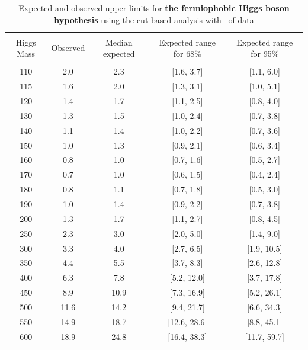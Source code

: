 \begin{table}[!hbp]
\begin{center}
\begin{tabular}{c c c c c}
\hline
\vspace{-3mm} && \\
 Higgs Mass   & Observed & Median expected & Expected range for 68\% & Expected range for 95\%   \\
\vspace{-3mm} && \\
\hline
110 & 2.0 & 2.3 & [1.6, 3.7] & [1.1, 6.0] \\
115 & 1.6 & 2.0 & [1.3, 3.1] & [1.0, 5.1] \\
120 & 1.4 & 1.7 & [1.1, 2.5] & [0.8, 4.0] \\
130 & 1.3 & 1.5 & [1.0, 2.4] & [0.7, 3.8] \\
140 & 1.1 & 1.4 & [1.0, 2.2] & [0.7, 3.6] \\
150 & 1.0 & 1.3 & [0.9, 2.1] & [0.6, 3.4] \\
160 & 0.8 & 1.0 & [0.7, 1.6] & [0.5, 2.7] \\
170 & 0.7 & 1.0 & [0.6, 1.5] & [0.4, 2.4] \\
180 & 0.8 & 1.1 & [0.7, 1.8] & [0.5, 3.0] \\
190 & 1.0 & 1.4 & [0.9, 2.2] & [0.7, 3.8] \\
200 & 1.3 & 1.7 & [1.1, 2.7] & [0.8, 4.5] \\
250 & 2.3 & 3.0 & [2.0, 5.0] & [1.4, 9.0] \\
300 & 3.3 & 4.0 & [2.7, 6.5] & [1.9, 10.5] \\
350 & 4.4 & 5.5 & [3.7, 8.3] & [2.6, 12.8] \\
400 & 6.3 & 7.8 & [5.2, 12.0] & [3.7, 17.8] \\
450 & 8.9 & 10.9 & [7.3, 16.9] & [5.2, 26.1] \\
500 & 11.6 & 14.2 & [9.4, 21.7] & [6.6, 34.3] \\
550 & 14.9 & 18.7 & [12.6, 28.6] & [8.8, 45.1] \\
600 & 18.9 & 24.8 & [16.4, 38.3] & [11.7, 59.7] \\
\hline
\end{tabular}
\caption{Expected and observed upper limits for {\bf the fermiophobic
    Higgs boson hypothesis} using the cut-based analysis with
  \intlumi\ of data}
\label{tab:cutbase_uls_fp}
\end{center}
\end{table}
